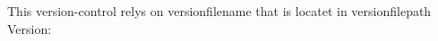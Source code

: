 \documentclass{article}
\newcounter{versionNumber}
\begin{document}
This version-control relys on versionfilename that is locatet in versionfilepath
Version: \theversionNumber
\end{document}

